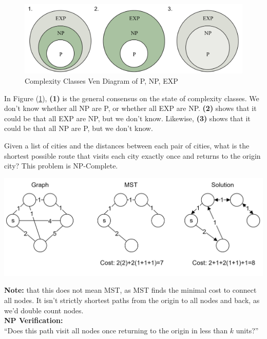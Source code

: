 \begin{figure}[h!]
    \centering
    \includegraphics[width=1\textwidth]{Sections/hard/diagrams.png}
    \caption{Complexity Classes Ven Diagram of P, NP, EXP}
    \label{fig:ven}
\end{figure}

In Figure (\ref{fig:ven}), \textbf{(1)} is the general consensus on the state of complexity classes. We don't know whether 
all NP are P, or whether all EXP are NP. \textbf{(2)} shows that it could be that all EXP are NP, but we don't know. Likewise, \textbf{(3)} shows that it could be that all NP are P, but we don't know.

\newpage 
\begin{theo}

    \label{TSP}

    Given a list of cities and the distances between each pair of cities, 
    what is the shortest possible route that visits each city exactly once and returns to the origin city?
    This problem is NP-Complete. 

    \begin{center}
    \includegraphics[width=1\textwidth]{Sections/hard/graphs.png}
    \end{center}
    \noindent
    \textbf{Note:} that this does not mean MST, as MST finds the minimal cost to connect all nodes. It isn't strictly shortest paths
    from the origin to all nodes and back, as we'd double count nodes.\\

    \noindent
    \textbf{NP Verification:}\\
    ``Does this path visit all nodes once returning to the origin in less than $k$ units?''

\end{theo}
    